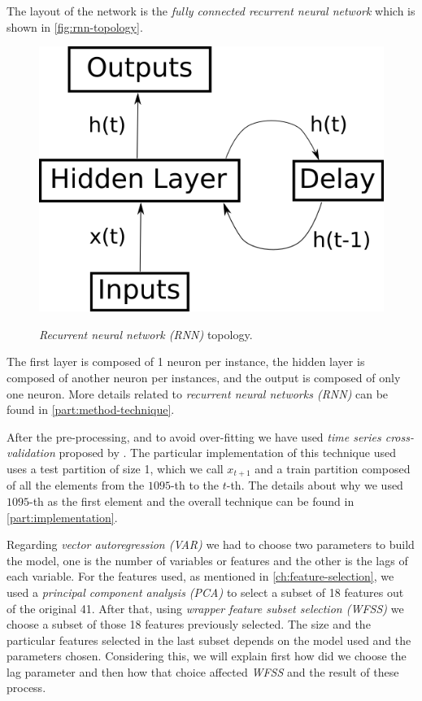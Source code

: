 The layout of the network is the \textit{fully connected recurrent
neural network} which is shown in \autoref{fig:rnn-topology}.

\begin{figure}[bth] \myfloatalign
{\includegraphics[width=.4\linewidth] {gfx/rnn-topology}}
  \caption{\textit{Recurrent neural network (RNN)} topology.}
  \label{fig:rnn-topology}
\end{figure}

The first layer is composed of 1 neuron per instance, the hidden layer
is composed of another neuron per instances, and the output is
composed of only one neuron. More details related to \textit{recurrent
neural networks (RNN)} can be found in
\autoref{part:method-technique}.

After the pre-processing, and to avoid over-fitting we have used
\textit{time series cross-validation} proposed by
\cite{robjhyndman2010}. The particular implementation of this
technique used uses a test partition of size 1, which we call $x_{t +
1}$ and a train partition composed of all the elements from the
$1095$-th to the $t$-th. The details about why we used $1095$-th as
the first element and the overall technique can be found in
\autoref{part:implementation}.

Regarding \textit{vector autoregression (VAR)} we had to choose two
parameters to build the model, one is the number of variables or
features and the other is the lags of each variable. For the features
used, as mentioned in \autoref{ch:feature-selection}, we used a
\textit{principal component analysis (PCA)} to select a subset of 18
features out of the original 41. After that, using \textit{wrapper
  feature subset selection (WFSS)} we choose a subset of those 18
features previously selected. The size and the particular features
selected in the last subset depends on the model used and the
parameters chosen. Considering this, we will explain first how did we
choose the lag parameter and then how that choice affected
\textit{WFSS} and the result of these process.

